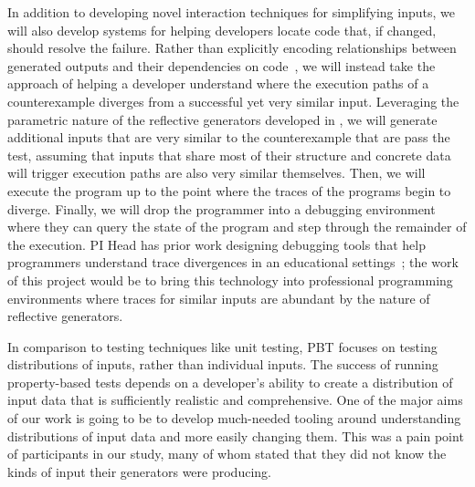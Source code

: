 

In addition to developing novel interaction techniques for simplifying inputs,
we will also develop systems for helping developers locate code that, if
changed, should resolve the failure. Rather than explicitly encoding
relationships between generated outputs and their dependencies on
code~\cite{ref:ko2009finding}, we will instead take the approach of helping a
developer understand where the execution paths of a counterexample diverges from
a successful yet very similar input. Leveraging the parametric nature of the
reflective generators developed in , we will generate
additional inputs that are very similar to the counterexample that are pass the
test, assuming that inputs that share most of their structure and concrete data
will trigger execution paths are also very similar themselves. Then, we will
execute the program up to the point where the traces of the programs begin to
diverge. Finally, we will drop the programmer into a debugging environment where
they can query the state of the program and step through the remainder of the
execution. PI Head has prior work designing debugging tools that help
programmers understand trace divergences in an educational
settings~\cite{ref:suzuki2017tracediff}; the work of this project would be to
bring this technology into professional programming environments where traces
for similar inputs are abundant by the nature of reflective generators.


In comparison to testing techniques like unit testing, PBT focuses on testing
distributions of inputs, rather than individual inputs. The success of running
property-based tests depends on a developer's ability to create a distribution
of input data that is sufficiently realistic and comprehensive. One of the major
aims of our work is going to be to develop much-needed tooling around
understanding distributions of input data and more easily changing them. This
was a pain point of participants in our study, many of whom stated that they did
not know the kinds of input their generators were producing.


